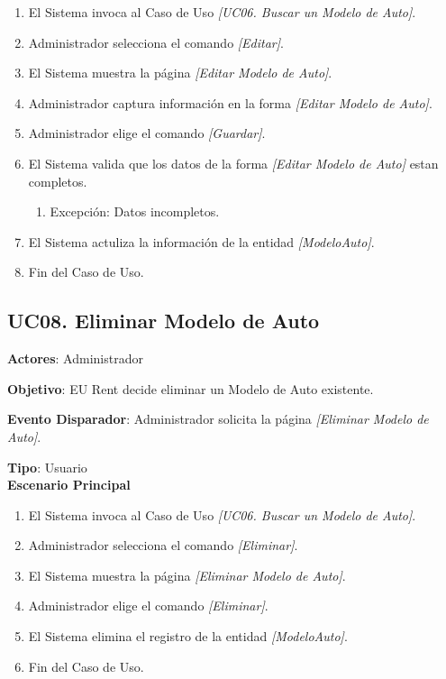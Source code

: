 \documentclass[10pt, letterpaper]{report}
\begin{document}
\begin{enumerate}
\item El Sistema invoca al Caso de Uso \textit{[UC06. Buscar un Modelo de Auto]}.
\item Administrador selecciona el comando \textit{[Editar]}.
\item El Sistema muestra la página \textit{[Editar Modelo de Auto]}.
\item Administrador captura información en la forma \textit{[Editar Modelo de Auto]}.
\item Administrador elige el comando \textit{[Guardar]}.
\item El Sistema valida que los datos de la forma \textit{[Editar Modelo de Auto]} estan completos.
	\begin{enumerate}
		\item Excepción: Datos incompletos.
	\end{enumerate}
\item El Sistema actuliza la información de la entidad \textit{[ModeloAuto]}.
\item Fin del Caso de Uso.
\end{enumerate}
\subsection{UC08. Eliminar Modelo de Auto} \label{EliminarModeloAuto}
\textbf{Actores}: Administrador

\textbf{Objetivo}: EU Rent decide eliminar un Modelo de Auto existente.

\textbf{Evento Disparador}: Administrador solicita la página \textit{[Eliminar Modelo de Auto]}.

\textbf{Tipo}: Usuario\\

\textbf{Escenario Principal}

\begin{enumerate}
\item El Sistema invoca al Caso de Uso \textit{[UC06. Buscar un Modelo de Auto]}.
\item Administrador selecciona el comando \textit{[Eliminar]}.
\item El Sistema muestra la página \textit{[Eliminar Modelo de Auto]}.
\item Administrador elige el comando \textit{[Eliminar]}.
\item El Sistema elimina el registro de la entidad \textit{[ModeloAuto]}.
\item Fin del Caso de Uso.
\end{enumerate}
\end{document}
